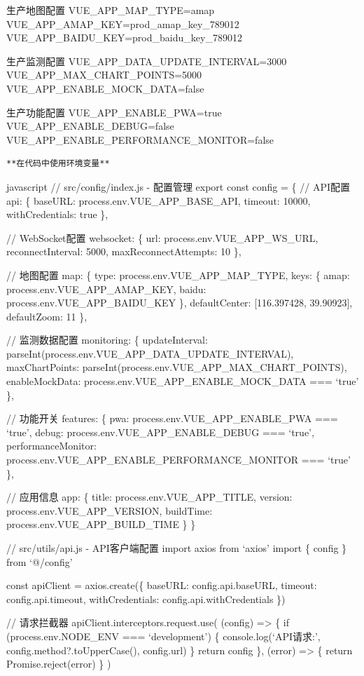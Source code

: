 {{ 生产地图配置 VUE\_APP\_MAP\_TYPE=amap VUE\_APP\_AMAP\_KEY=prod\_amap\_key\_789012 VUE\_APP\_BAIDU\_KEY=prod\_baidu\_key\_789012

 生产监测配置 VUE\_APP\_DATA\_UPDATE\_INTERVAL=3000 VUE\_APP\_MAX\_CHART\_POINTS=5000 VUE\_APP\_ENABLE\_MOCK\_DATA=false

 生产功能配置 VUE\_APP\_ENABLE\_PWA=true VUE\_APP\_ENABLE\_DEBUG=false VUE\_APP\_ENABLE\_PERFORMANCE\_MONITOR=false

\begin{lstlisting}
**在代码中使用环境变量**
\end{lstlisting}

javascript // src/config/index.js - 配置管理 export const config = \{ // API配置 api: \{ baseURL: process.env.VUE\_APP\_BASE\_API, timeout: 10000, withCredentials: true \},

// WebSocket配置 websocket: \{ url: process.env.VUE\_APP\_WS\_URL, reconnectInterval: 5000, maxReconnectAttempts: 10 \},

// 地图配置 map: \{ type: process.env.VUE\_APP\_MAP\_TYPE, keys: \{ amap: process.env.VUE\_APP\_AMAP\_KEY, baidu: process.env.VUE\_APP\_BAIDU\_KEY \}, defaultCenter: {[}116.397428, 39.90923{]}, defaultZoom: 11 \},

// 监测数据配置 monitoring: \{ updateInterval: parseInt(process.env.VUE\_APP\_DATA\_UPDATE\_INTERVAL), maxChartPoints: parseInt(process.env.VUE\_APP\_MAX\_CHART\_POINTS), enableMockData: process.env.VUE\_APP\_ENABLE\_MOCK\_DATA === `true' \},

// 功能开关 features: \{ pwa: process.env.VUE\_APP\_ENABLE\_PWA === `true', debug: process.env.VUE\_APP\_ENABLE\_DEBUG === `true', performanceMonitor: process.env.VUE\_APP\_ENABLE\_PERFORMANCE\_MONITOR === `true' \},

// 应用信息 app: \{ title: process.env.VUE\_APP\_TITLE, version: process.env.VUE\_APP\_VERSION, buildTime: process.env.VUE\_APP\_BUILD\_TIME \} \}

// src/utils/api.js - API客户端配置 import axios from `axios' import \{ config \} from `@/config'

const apiClient = axios.create(\{ baseURL: config.api.baseURL, timeout: config.api.timeout, withCredentials: config.api.withCredentials \})

// 请求拦截器 apiClient.interceptors.request.use( (config) =\textgreater{} \{ if (process.env.NODE\_ENV === `development') \{ console.log(`API请求:', config.method?.toUpperCase(), config.url) \} return config \}, (error) =\textgreater{} \{ return Promise.reject(error) \} )

}}
